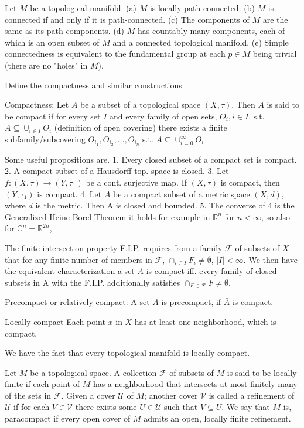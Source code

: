 Let \( M \) be a topological manifold.
(a) \( M \) is locally path-connected.
(b) \( M \) is connected if and only if it is path-connected.
(c) The components of \( M \) are the same as its path components.
(d) \( M \) has countably many components, each of which is an open subset of \( M \) and
a connected topological manifold.
(e) Simple connectedness is equivalent to the fundamental group at each \(p \in M \) being trivial 
(there are no "holes" in \( M \)).


Define the compactness and similar constructions

Compactness:
Let \( A \) be a subset of a topological space \( (X, \tau) \),
Then \( A \) is said to be compact if for every set \( I \) and every family of open sets, 
\( O_i, i \in I \), s.t. \( A \subseteq \cup_{i \in I} O_i \) (definition of open covering) there exists
a finite subfamily/subcovering \( O_{i_1}, O_{i_2}, \dots, O_{i_n} \) s.t. \( A \subseteq \cup_{i=0}^{\infty} O_i \)

Some useful propositions are.
1. Every closed subset of a compact set is compact.
2. A compact subset of a Hausdorff top. space is closed.
3. Let \( f : (X, \tau) \to (Y, \tau_1) \) be a cont. surjective map. If \( (X, \tau) \) is compact, then \( (Y, \tau_1) \) is compact.
4. Let \( A \) be a compact subset of a metric space \( (X, d) \), where \( d \) is the metric.
   Then A is closed and bounded.
5. The converse of 4 is the Generalized Heine Borel Theorem it holds for example in \( \mathbb{R}^n \) for \( n < \infty \), so also for \( \mathbb{C}^n = \mathbb{R}^{2n}\),

The finite intersection property F.I.P. requires from a family \( \mathcal{F} \) of subsets of \( X \) that for any finite number 
of members in \( \mathcal{F} \), \( \cap_{i \in I} F_i  \neq \emptyset \), \( |I| < \infty \).
We then have the equivalent characterization a set \( A \) is compact iff. every family of closed subsets in A
with the F.I.P. additionally satisfies \( \cap_{F \in \mathcal{F}} F \neq \emptyset \).

Precompact or relatively compact:
A set \( A \) is precompact, if \( \bar{A} \) is compact.

Locally compact
Each point \( x \) in \( X \) has at least one neighborhood, which is compact.

We have the fact that every topological manifold is locally compact.

Let \( M \) be a topological space. A collection \( \mathcal{F} \) of subsets of \( M \) is said to be locally
finite if each point of \( M \) has a neighborhood that intersects at most finitely many
of the sets in \( \mathcal{F} \). Given a cover \( \mathcal{U} \) of \( M \); another cover \( \mathcal{V} \) is called a refinement of
\( \mathcal{U} \) if for each \( V \in \mathcal{V} \) there exists some \( U \in \mathcal{U} \) such that \( V \subseteq U \). 
We say that \( M \) is, paracompact if every open cover of \( M \) admits an open, locally finite refinement.

